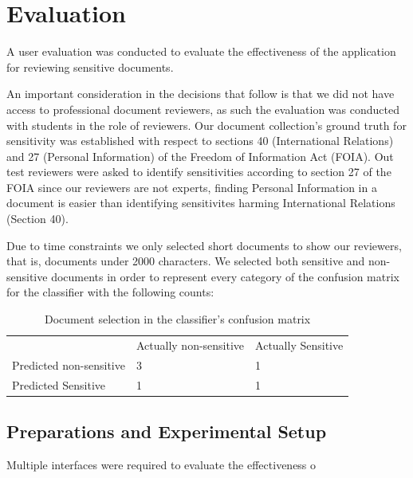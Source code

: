 \documentclass{l4proj}
\begin{document}
\chapter{Evaluation}

A user evaluation was conducted to evaluate the effectiveness of the application for reviewing sensitive documents. 

An important consideration in the decisions that follow is that we did not have access to professional document reviewers, as such the evaluation was conducted with students in the role of reviewers. 
Our document collection's ground truth for sensitivity was established with respect to sections 40 (International Relations) and 27 (Personal Information) of the Freedom of Information Act (FOIA).
Out test reviewers were asked to identify sensitivities according to section 27 of the FOIA since our reviewers are not experts, finding Personal Information in a document is easier than identifying sensitivites harming International Relations (Section 40).

Due to time constraints we only selected short documents to show our reviewers, that is, documents under 2000 characters. 
We selected both sensitive and non-sensitive documents in order to represent every category of the confusion matrix for the classifier with the following counts:
\begin{table}[h]
    \begin{tabular}{l ll}
                                & Actually non-sensitive & Actually Sensitive \\ 
        Predicted non-sensitive & 3                      & 1                  \\
        Predicted Sensitive     & 1                      & 1                 
    \end{tabular}
    \caption{Document selection in the classifier's confusion matrix}
    \label{tab:confusion-matrix-selection}
\end{table}


\section{Preparations and Experimental Setup}

Multiple interfaces were required to evaluate the effectiveness o
\end{document}
